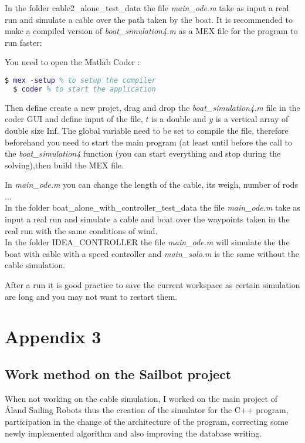 \documentclass[twoside,12pt]{report} %
\begin{document}
In the folder cable2\_alone\_test\_data the file \textit{main\_ode.m}  take as input a real run and simulate
a cable over the path taken by the boat. It is recommended to make a compiled version of \textit{boat\_simulation4.m} as a MEX file for the program to run faster:

You need to open the Matlab Coder :
\begin{lstlisting}[language=matlab]
  $ mex -setup % to setup the compiler
  $ coder % to start the application
\end{lstlisting}

Then define create a new projet, drag and drop the \textit{boat\_simulation4.m} file in the coder GUI and define input of the file, $t$ is a double and $y$ is a vertical array of double size Inf. The global variable need to be set to compile the file, therefore beforehand you need to start the main program (at least until before the call to the   \textit{boat\_simulation4} function (you can start everything and stop during the solving),then build the MEX file.

In \textit{main\_ode.m} you can change the length of the cable, its weigh, number of rods ... \\


In the folder boat\_alone\_with\_controller\_test\_data the file \textit{main\_ode.m}  take as input a real run and simulate
a cable and boat over the waypoints taken in the real run with the same conditions of wind. \\


In the folder IDEA\_CONTROLLER the file \textit{main\_ode.m}  will simulate the the boat with cable with a speed controller and \textit{main\_solo.m} is the same without the cable simulation.

After a run it is good practice to save the current workspace as certain simulation are long and you may not want to restart them.



\chapter*{Appendix 3}

\section*{Work method on the Sailbot project}

When not working on the cable simulation, I worked on the main project of 
\r{A}land Sailing Robots thus the creation of the simulator for the C++ program, participation in the change of the architecture of the program, correcting some newly implemented  algorithm and also improving the database writing.
\end{document}
